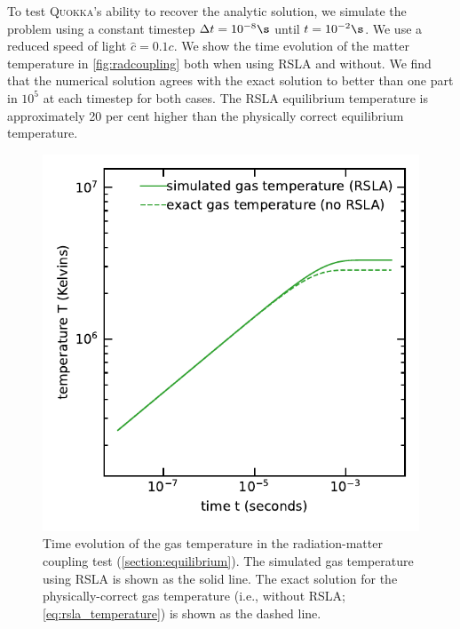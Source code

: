 \documentclass[fleqn,usenatbib]{mnras}
\newcommand{\quokka}{\textsc{Quokka}}
\begin{document}
To test \quokka's ability to recover the analytic solution, we simulate the problem using a constant timestep $\Delta t = 10^{-8} \s$ until $t = 10^{-2} \s$. We use a reduced speed of light $\hat c = 0.1 c$. We show the time evolution of the matter temperature in \autoref{fig:radcoupling} both when using RSLA and without. We find that the numerical solution agrees with the exact solution to better than one part in $10^{5}$ at each timestep for both cases. The RSLA equilibrium temperature is approximately 20 per cent higher than the physically correct equilibrium temperature.
\begin{figure}
    \includegraphics[width=\columnwidth]{radcoupling_rsla.pdf}
    \caption{Time evolution of the gas temperature in the radiation-matter coupling test (\autoref{section:equilibrium}). The simulated gas temperature using RSLA is shown as the solid line. The exact solution for the physically-correct gas temperature (i.e., without RSLA; \autoref{eq:rsla_temperature}) is shown as the dashed line.}
    \label{fig:radcoupling}
\end{figure}
\end{document}
